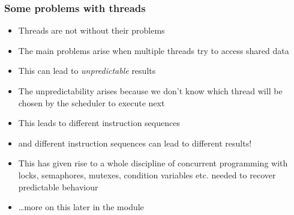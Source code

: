 \documentclass[hyperref={pdfpagelabels=false},svgnames]{beamer}
\begin{document}
\begin{frame}
  \frametitle{Some problems with threads}
  \begin{itemize}
    \item Threads are not without their problems
    \item The main problems arise when multiple threads try
      to access shared data
    \item This can lead to \emph{unpredictable} results
    \item The unpredictability arises because we don't know
      which thread will be chosen by the scheduler to execute
      next
    \item This leads to different instruction sequences
    \item and different instruction sequences can lead to different
      results!
    \item This has given rise to a whole discipline of concurrent programming
      with locks, semaphores, mutexes, condition variables etc. needed to
      recover predictable behaviour
    \item \ldots more on this later in the module
  \end{itemize}
\end{frame}
\end{document}
